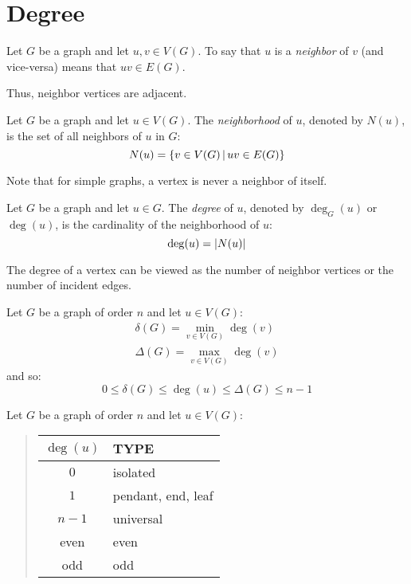 \documentclass[letterpaper,12pt,fleqn]{article}
\renewcommand{\d}{\delta}
\newcommand{\D}{\Delta}
\begin{document}
\section*{Degree}

\begin{definition}[Neighbor]
  Let \(G\) be a graph and let \(u,v\in V(G)\).  To say that \(u\) is a \emph{neighbor} of \(v\) (and vice-versa)
  means that \(uv\in E(G)\).
\end{definition}

Thus, neighbor vertices are adjacent.

\begin{definition}[Neighborhood]
  Let \(G\) be a graph and let \(u\in V(G)\).  The \emph{neighborhood} of \(u\), denoted by \(N(u)\), is the set of
  all neighbors of \(u\) in \(G\):
  \[N(u)=\left\{{v\in V(G)}\,\middle|\,{uv\in E(G)}\right\}\]
\end{definition}

Note that for simple graphs, a vertex is never a neighbor of itself.

\begin{definition}[Degree]
  Let \(G\) be a graph and let \(u\in G\).  The \emph{degree} of \(u\), denoted by \(\deg_G(u)\) or \(\deg(u)\), is
  the cardinality of the neighborhood of \(u\):
  \[\deg(u)=\lvert N(u)\rvert\]
\end{definition}

The degree of a vertex can be viewed as the number of neighbor vertices or the number of incident edges.

\begin{notation}
  Let \(G\) be a graph of order \(n\) and let \(u\in V(G)\):
  \begin{gather*}
    \d(G)=\min_{v\in V(G)}\deg(v) \\
    \D(G)=\max_{v\in V(G)}\deg(v)
  \end{gather*}
  and so:
  \[0\le\d(G)\le\deg(u)\le\D(G)\le n-1\]
\end{notation}

\begin{definition}
  Let \(G\) be a graph of order \(n\) and let \(u\in V(G)\):
  \begin{quote}
    \begin{tabular}{c|l}
      \(\deg(u)\) & TYPE \\
      \hline
      \(0\) & isolated \\
      \(1\) & pendant, end, leaf \\
      \(n-1\) & universal \\
      even & even \\
      odd & odd
    \end{tabular}
  \end{quote}
\end{definition}
\end{document}
